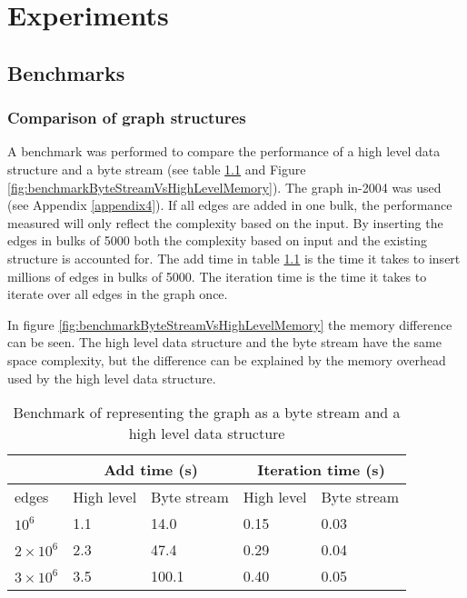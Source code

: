 \chapter{Experiments}

\section{Benchmarks}

\subsection{Comparison of graph structures} \label{bench:graphStructure}
A benchmark was performed to compare the performance of a high level data structure and a byte stream (see table \ref{table:byteStreamHighLevelTime} and Figure \ref{fig:benchmarkByteStreamVsHighLevelMemory}). The graph in-2004 was used (see Appendix \ref{appendix4}). If all edges are added in one bulk, the performance measured will only reflect the complexity based on the input. By inserting the edges in bulks of 5000 both the complexity based on input and the existing structure is accounted for. The add time in table \ref{table:byteStreamHighLevelTime} is the time it takes to insert millions of edges in bulks of 5000. The iteration time is the time it takes to iterate over all edges in the graph once.

In figure \ref{fig:benchmarkByteStreamVsHighLevelMemory} the memory difference can be seen. The high level data structure and the byte stream have the same space complexity, but the difference can be explained by the memory overhead used by the high level data structure. 

\begin{table}[h]
    \center
    \begin{tabular}{ | l | l | l | l | l |}
        \hline
            & \multicolumn{2}{c}{Add time (s)} \vline & \multicolumn{2}{c}{Iteration time (s)} \vline \\ \hline
        edges             & High level & Byte stream & High level & Byte stream \\ \hline
        $10^6$            & 1.1        & 14.0        & 0.15       & 0.03 \\ \hline
        $2 \times 10^6$   & 2.3        & 47.4        & 0.29       & 0.04 \\ \hline 
        $3 \times 10^6$   & 3.5        & 100.1       & 0.40       & 0.05 \\ \hline
    \end{tabular}
    \captionsetup{justification=centering}
    \caption{Benchmark of representing the graph as a byte stream and a high level data structure}
    \label{table:byteStreamHighLevelTime}
\end{table}

